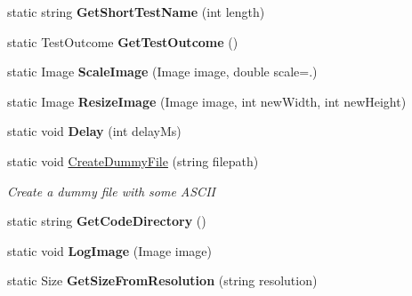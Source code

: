\begin{DoxyCompactItemize}
\item 
\hypertarget{class_proto_test_1_1_golem_1_1_core_1_1_common_ad27e6942f7642caa46abc9d5a9f5f493}{static string {\bfseries Get\-Short\-Test\-Name} (int length)}\label{class_proto_test_1_1_golem_1_1_core_1_1_common_ad27e6942f7642caa46abc9d5a9f5f493}

\item 
\hypertarget{class_proto_test_1_1_golem_1_1_core_1_1_common_abc2115a16a433d2acd858a4ed6c6037b}{static Test\-Outcome {\bfseries Get\-Test\-Outcome} ()}\label{class_proto_test_1_1_golem_1_1_core_1_1_common_abc2115a16a433d2acd858a4ed6c6037b}

\item 
\hypertarget{class_proto_test_1_1_golem_1_1_core_1_1_common_afbcb2481080c4d4fd8f9f19e69623c83}{static Image {\bfseries Scale\-Image} (Image image, double scale=.)}\label{class_proto_test_1_1_golem_1_1_core_1_1_common_afbcb2481080c4d4fd8f9f19e69623c83}

\item 
\hypertarget{class_proto_test_1_1_golem_1_1_core_1_1_common_a49d19282a8e902e56b4902693071407b}{static Image {\bfseries Resize\-Image} (Image image, int new\-Width, int new\-Height)}\label{class_proto_test_1_1_golem_1_1_core_1_1_common_a49d19282a8e902e56b4902693071407b}

\item 
\hypertarget{class_proto_test_1_1_golem_1_1_core_1_1_common_aa353a68c9d004bc818e7e87b6679fb45}{static void {\bfseries Delay} (int delay\-Ms)}\label{class_proto_test_1_1_golem_1_1_core_1_1_common_aa353a68c9d004bc818e7e87b6679fb45}

\item 
static void \hyperlink{class_proto_test_1_1_golem_1_1_core_1_1_common_a8f9933e4adce1a4407d1c6fd4802cb2a}{Create\-Dummy\-File} (string filepath)
\begin{DoxyCompactList}\small\item\em Create a dummy file with some A\-S\-C\-I\-I \end{DoxyCompactList}\item 
\hypertarget{class_proto_test_1_1_golem_1_1_core_1_1_common_acabc1a38404284cf27b25472b32b0a2b}{static string {\bfseries Get\-Code\-Directory} ()}\label{class_proto_test_1_1_golem_1_1_core_1_1_common_acabc1a38404284cf27b25472b32b0a2b}

\item 
\hypertarget{class_proto_test_1_1_golem_1_1_core_1_1_common_a8dde6601459b2886a512210f6d15a468}{static void {\bfseries Log\-Image} (Image image)}\label{class_proto_test_1_1_golem_1_1_core_1_1_common_a8dde6601459b2886a512210f6d15a468}

\item 
\hypertarget{class_proto_test_1_1_golem_1_1_core_1_1_common_a9cc1a93d6da49ed38c47dcf9aebc4429}{static Size {\bfseries Get\-Size\-From\-Resolution} (string resolution)}\label{class_proto_test_1_1_golem_1_1_core_1_1_common_a9cc1a93d6da49ed38c47dcf9aebc4429}

\end{DoxyCompactItemize}


